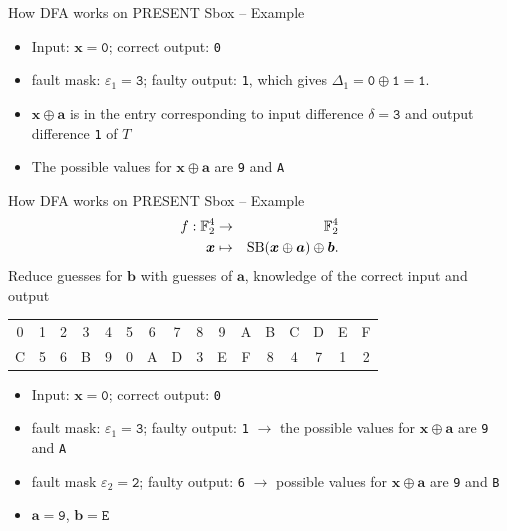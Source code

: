 \begin{frame}{How DFA works on PRESENT Sbox -- Example}
\begin{table}
\end{table}
    \begin{example}
        \begin{itemize}
            \item  Input: $\boldsymbol{x}=\texttt{0}$; correct output: \texttt{0}
            \item fault mask: $\varepsilon_1=\texttt{3}$; faulty output: \texttt{1}, which gives $\Delta_1=\texttt{0}\oplus\texttt{1}=\texttt{1}$.
            \item $\boldsymbol{x}\oplus\boldsymbol{a}$ is in the entry corresponding to input difference $\delta=\texttt{3}$ and output difference \texttt{1} of $T$
            \item The possible values for $\boldsymbol{x}\oplus\boldsymbol{a}$ are \texttt{9} and \texttt{A}
        \end{itemize}
    \end{example}
\end{frame}

\begin{frame}{How DFA works on PRESENT Sbox -- Example}
\begin{eqnarray*}
    f:{\mathbb F}_2^4&\to&{\mathbb F}_2^4\\
    \boldsymbol{x}&\mapsto& \text{SB}(\boldsymbol{x}\oplus\boldsymbol{a})\oplus\boldsymbol{b}.\nonumber
\end{eqnarray*}
Reduce guesses for $\boldsymbol{b}$ with guesses of $\boldsymbol{a}$, knowledge of the correct input and output
\begin{table}
\begin{tabular}{cccccccccccccccc}\hline
0 & 1 & 2 & 3 & 4 & 5 & 6 & 7 & 8 & 9 & A & B & C & D & E & F \\
C & 5 & 6 & B & 9 & 0 & A & D & 3 & E & F & 8 & 4 & 7 & 1 & 2\\\hline
\end{tabular}
\end{table}
    \begin{example}
        \begin{itemize}
            \item  Input: $\boldsymbol{x}=\texttt{0}$; correct output: \texttt{0}
            \item fault mask: $\varepsilon_1=\texttt{3}$; faulty output: \texttt{1} $\rightarrow$ the possible values for $\boldsymbol{x}\oplus\boldsymbol{a}$ are \texttt{9} and \texttt{A}
            \item fault mask $\varepsilon_2=\texttt{2}$; faulty output: \texttt{6} $\rightarrow$ possible values for $\boldsymbol{x}\oplus\boldsymbol{a}$ are \texttt{9} and \texttt{B}
            \item $\boldsymbol{a}=\texttt{9}$, $\boldsymbol{b}=\texttt{E}$
        \end{itemize}
    \end{example}
\end{frame}

